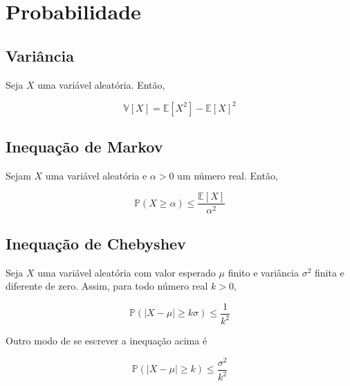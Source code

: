 \chapter{Probabilidade}
\label{ap:probability}

\section{Variância}
\label{ap:variance}

Seja $X$ uma variável aleatória. Então,

\[ \mathbb{V}[X] = \mathbb{E}[X^2] - \mathbb{E}[X]^2\]

\section{Inequação de Markov}
\label{ap:markov}

Sejam $X$ uma variável aleatória e $\alpha > 0$ um número real. Então,

\[ \mathbb{P}(X \geq \alpha) \leq \frac{\mathbb{E}[X]}{\alpha^2}\]


\section{Inequação de Chebyshev}
\label{ap:chebyshev}

Seja $X$ uma variável aleatória com valor esperado $\mu$ finito e variância $\sigma^2$ finita e diferente de zero. 
Assim, para todo número real $k > 0$, 

\[ \mathbb{P}(| X - \mu| \geq k\sigma) \leq \frac{1}{k^2}\]

Outro modo de se escrever a inequação acima é 

\[ \mathbb{P}(| X - \mu| \geq k) \leq \frac{\sigma^2}{k^2} \]